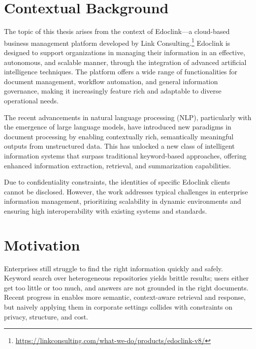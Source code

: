 \cleardoublepage
\label{chap:intro}
\section{Contextual Background}
The topic of this thesis arises from the context of Edoclink—a cloud-based business management platform developed by Link Consulting.\footnote{\url{https://linkconsulting.com/what-we-do/products/edoclink-v8/}} Edoclink is designed to support organizations in managing their information in an effective, autonomous, and scalable manner, through the integration of advanced artificial intelligence techniques. The platform offers a wide range of functionalities for document management, workflow automation, and general information governance, making it increasingly feature rich and adaptable to diverse operational needs.

The recent advancements in natural language processing (\gls{NLP}), particularly with the emergence of large language models, have introduced new paradigms in document processing by enabling contextually rich, semantically meaningful outputs from unstructured data. This has unlocked a new class of intelligent information systems that surpass traditional keyword-based approaches, offering enhanced information extraction, retrieval, and summarization capabilities.

Due to confidentiality constraints, the identities of specific Edoclink clients cannot be disclosed. However, the work addresses typical challenges in enterprise information management, prioritizing scalability in dynamic environments and ensuring high interoperability with existing systems and standards.

\section{Motivation}

Enterprises still struggle to find the right information quickly and safely. Keyword search over heterogeneous repositories yields brittle results; users either get too little or too much, and answers are not grounded in the right documents. Recent progress in  enables more semantic, context-aware retrieval and response, but naively applying them in corporate settings collides with constraints on privacy, structure, and cost.

